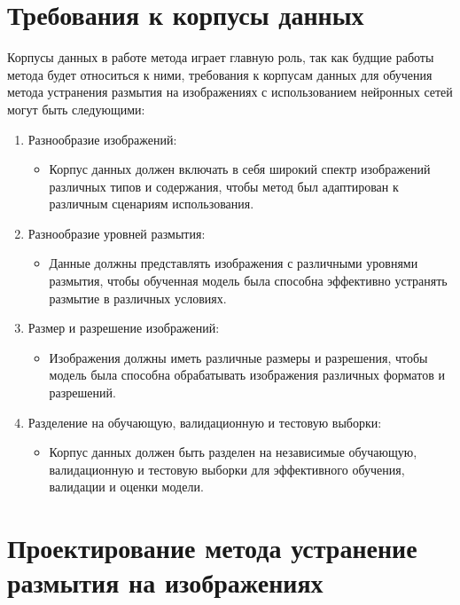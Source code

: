 \section{Требования к корпусы данных}

Корпусы данных в работе метода играет главную роль, так как будщие работы метода будет относиться к ними,  требования к корпусам данных для обучения метода устранения размытия на изображениях с использованием нейронных сетей могут быть следующими:

\begin{enumerate}
    \item Разнообразие изображений:
    \begin{itemize}
        \item Корпус данных должен включать в себя широкий спектр изображений различных типов и содержания, чтобы метод был адаптирован к различным сценариям использования.
    \end{itemize}

    \item Разнообразие уровней размытия:
    \begin{itemize}
        \item Данные должны представлять изображения с различными уровнями размытия, чтобы обученная модель была способна эффективно устранять размытие в различных условиях.
    \end{itemize}

    \item Размер и разрешение изображений:
    \begin{itemize}
        \item Изображения должны иметь различные размеры и разрешения, чтобы модель была способна обрабатывать изображения различных форматов и разрешений.
    \end{itemize}

    \item Разделение на обучающую, валидационную и тестовую выборки:
    \begin{itemize}
        \item Корпус данных должен быть разделен на независимые обучающую, валидационную и тестовую выборки для эффективного обучения, валидации и оценки модели.
    \end{itemize}
\end{enumerate}

\section{Проектирование метода устранение размытия на изображениях}

